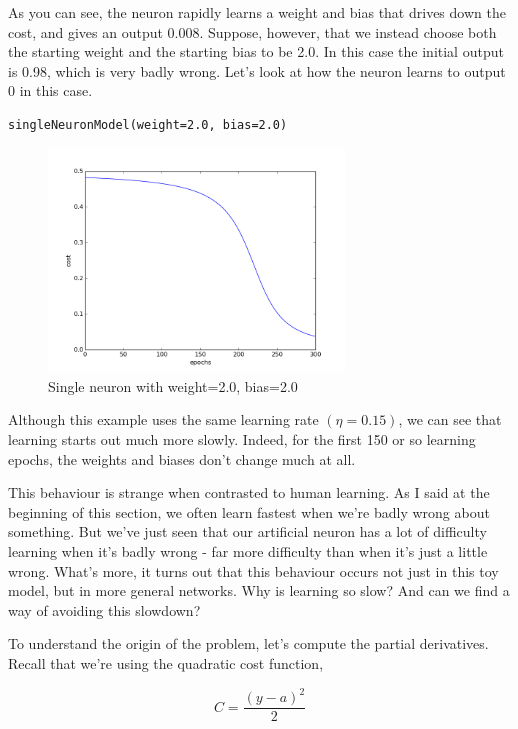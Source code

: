 \documentclass[12 pt]{article}
\begin{document}
As you can see, the neuron rapidly learns a weight and bias that drives
down the cost, and gives an output 0.008. Suppose, however, that we
instead choose both the starting weight and the starting bias to be 2.0.
In this case the initial output is 0.98, which is very badly wrong.
Let's look at how the neuron learns to output 0 in this case.

\begin{verbatim}
singleNeuronModel(weight=2.0, bias=2.0)
\end{verbatim}

\begin{figure}[htp]
\centering
\includegraphics[width=0.7\textwidth]{./figs/single_neuron3.png}
\caption{Single neuron with weight=2.0, bias=2.0}
\end{figure}

Although this example uses the same learning rate $ (\eta = 0.15) $,
we can see that learning starts out much more slowly. Indeed, for the
first 150 or so learning epochs, the weights and biases don't change
much at all.


This behaviour is strange when contrasted to human learning. As I said
at the beginning of this section, we often learn fastest when we're
badly wrong about something. But we've just seen that our artificial
neuron has a lot of difficulty learning when it's badly wrong - far more
difficulty than when it's just a little wrong. What's more, it turns out
that this behaviour occurs not just in this toy model, but in more
general networks. Why is learning so slow? And can we find a way of
avoiding this slowdown?

To understand the origin of the problem, let's compute the partial
derivatives. Recall that we're using the quadratic cost function,

\begin{equation}
    C = \frac {(y - a)^2}{2}
\end{equation}
\end{document}
